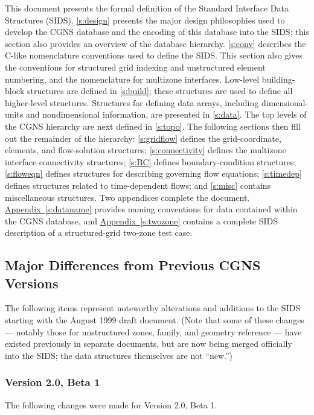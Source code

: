 This document presents the formal definition of the Standard Interface
Data Structures (SIDS). \autoref{s:design} presents the major design
philosophies used to develop the CGNS database and the encoding of
this database into the SIDS; this section also provides an overview
of the database hierarchy. \autoref{s:conv} describes the C-like
nomenclature conventions used to define the SIDS.  This section also
gives the conventions for structured grid indexing and unstructured
element numbering, and the nomenclature for multizone interfaces.
Low-level building-block structures are defined in \autoref{s:build};
these structures are used to define all higher-level structures.
Structures for defining data arrays, including dimensional-units and
nondimensional information, are presented in \autoref{s:data}.  The
top levels of the CGNS hierarchy are next defined in \autoref{s:topo}.
The following sections then fill out the remainder of the hierarchy:
\autoref{s:gridflow} defines the grid-coordinate, elements, and
flow-solution structures; \autoref{s:connectivity} defines the
multizone interface connectivity structures; \autoref{s:BC} defines
boundary-condition structures; \autoref{s:floweqn} defines structures
for describing governing flow equations; \autoref{s:timedep} defines
structures related to time-dependent flows; and \autoref{s:misc}
contains miscellaneous structures.  Two appendices complete the
document. \hyperref[s:dataname]{Appendix~\ref*{s:dataname}} provides
naming conventions for data contained within the CGNS database, and
\hyperref[s:twozone]{Appendix~\ref*{s:twozone}} contains a complete SIDS
description of a structured-grid two-zone test case.

\subsection{Major Differences from Previous CGNS Versions}
\label{s:differences}
The following items represent noteworthy alterations and additions to
the SIDS starting with the August 1999 draft document.
(Note that some of these changes --- notably those for unstructured
zones, family, and geometry reference --- have existed previously in
separate documents, but are now being merged officially into the SIDS;
the data structures themselves are not ``new.'')

\subsubsection{Version 2.0, Beta 1}
The following changes were made for Version 2.0, Beta 1.

